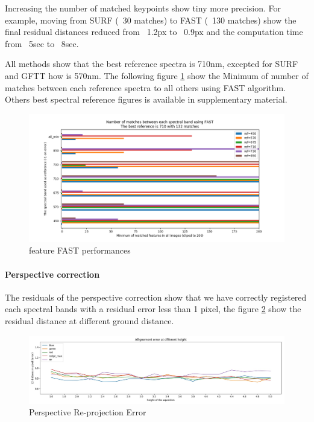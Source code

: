 \documentclass[]{elsarticle}
\begin{document}
	Increasing the number of matched keypoints show tiny more precision. For example, moving from SURF (~30 matches) to FAST (~130 matches)
	show the final residual distances reduced from ~1.2px to ~0.9px and the computation time from ~5sec to ~8sec.
	
	All methods show that the best reference spectra is 710nm, excepted for SURF and GFTT how is 570nm.
	The following figure \ref{fig:features-FAST-performances} show the Minimum of number of matches between each reference spectra to all others using FAST algorithm.
	Others best spectral reference figures is available in supplementary material.
	
	\begin{figure}[!htb]
		\centering
		\includegraphics[width=\linewidth]{../figures/comparaison-keypoint-matching-reference-FAST.png}
		\caption{feature FAST performances}
		\label{fig:features-FAST-performances}
	\end{figure}
	
	\paragraph{Perspective correction}
	The residuals of the perspective correction
	show that we have correctly registered each spectral bands with a residual error less than 1 pixel,
	the figure \ref{fig:perspective-error} show the residual distance at different ground distance.
	
	\begin{figure}[!htb]
		\centering
		\includegraphics[width=\linewidth]{../figures/prespective-allignement-rmse.jpg}
		\caption{Perspective Re-projection Error}
		\label{fig:perspective-error}
	\end{figure}
	
\end{document}
